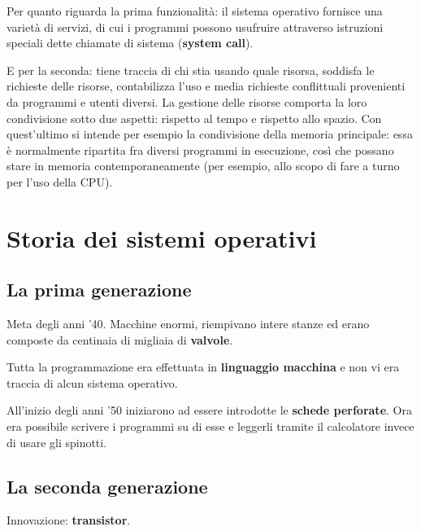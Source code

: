 Per quanto riguarda la prima funzionalità: il sistema operativo fornisce una varietà di servizi, di cui i programmi possono usufruire attraverso istruzioni speciali dette chiamate di sistema (\textbf{system call}).

E per la seconda: tiene traccia di chi stia usando quale risorsa, soddisfa le richieste delle risorse, contabilizza l'uso e media richieste conflittuali provenienti da programmi e utenti diversi.
La gestione delle risorse comporta la loro condivisione sotto due aspetti: rispetto al tempo e rispetto allo spazio. Con quest'ultimo si intende per esempio la condivisione della memoria principale: essa è normalmente
ripartita fra diversi programmi in esecuzione, così che possano stare in memoria contemporaneamente (per esempio, allo scopo di fare a turno per l'uso della CPU).

\section{Storia dei sistemi operativi}

\subsection{La prima generazione}
Meta degli anni '40.
Macchine enormi, riempivano intere stanze ed erano composte da centinaia di migliaia di \textbf{valvole}.

Tutta la programmazione era effettuata in \textbf{linguaggio macchina} e non vi era traccia di alcun sistema operativo.

All'inizio degli anni '50 iniziarono ad essere introdotte le \textbf{schede perforate}. Ora era possibile scrivere i programmi su di esse e leggerli tramite il calcolatore invece di usare gli spinotti.

\subsection{La seconda generazione}
Innovazione: \textbf{transistor}.

